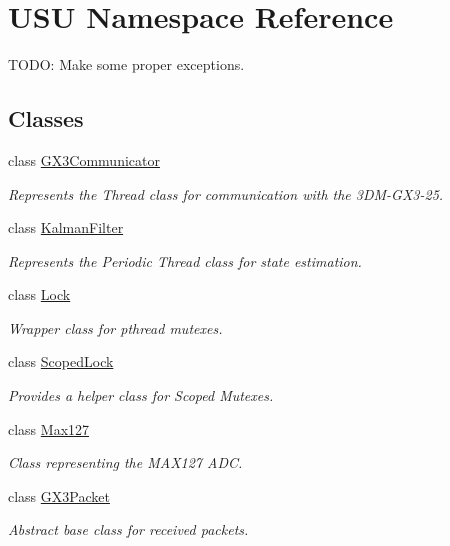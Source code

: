 \hypertarget{namespace_u_s_u}{\section{\-U\-S\-U \-Namespace \-Reference}
\label{namespace_u_s_u}
}


\-T\-O\-D\-O\-: \-Make some proper exceptions.  


\subsection*{\-Classes}
\begin{DoxyCompactItemize}
\item 
class \hyperlink{class_u_s_u_1_1_g_x3_communicator}{\-G\-X3\-Communicator}
\begin{DoxyCompactList}\small\item\em \-Represents the \-Thread class for communication with the 3\-D\-M-\/\-G\-X3-\/25. \end{DoxyCompactList}\item 
class \hyperlink{class_u_s_u_1_1_kalman_filter}{\-Kalman\-Filter}
\begin{DoxyCompactList}\small\item\em \-Represents the \-Periodic \-Thread class for state estimation. \end{DoxyCompactList}\item 
class \hyperlink{class_u_s_u_1_1_lock}{\-Lock}
\begin{DoxyCompactList}\small\item\em \-Wrapper class for pthread mutexes. \end{DoxyCompactList}\item 
class \hyperlink{class_u_s_u_1_1_scoped_lock}{\-Scoped\-Lock}
\begin{DoxyCompactList}\small\item\em \-Provides a helper class for \-Scoped \-Mutexes. \end{DoxyCompactList}\item 
class \hyperlink{class_u_s_u_1_1_max127}{\-Max127}
\begin{DoxyCompactList}\small\item\em \-Class representing the \-M\-A\-X127 \-A\-D\-C. \end{DoxyCompactList}\item 
class \hyperlink{class_u_s_u_1_1_g_x3_packet}{\-G\-X3\-Packet}
\begin{DoxyCompactList}\small\item\em \-Abstract base class for received packets. \end{DoxyCompactList}\item 

\end{DoxyCompactItemize}
